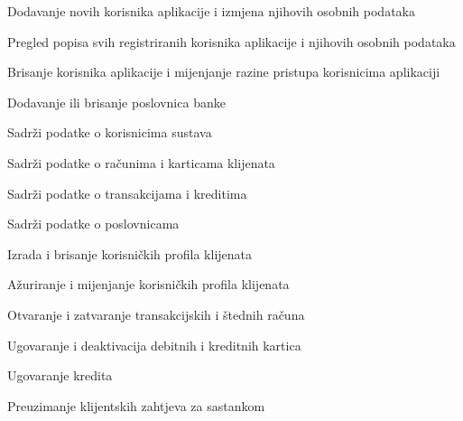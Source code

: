 			
			\begin{packed_enum}
				\item  {}
				
				\begin{packed_enum}
					
					\item Dodavanje novih korisnika aplikacije i izmjena njihovih osobnih podataka
					\item Pregled popisa svih registriranih korisnika aplikacije i njihovih osobnih podataka
					\item Brisanje korisnika aplikacije i mijenjanje razine pristupa korisnicima aplikaciji
					\item Dodavanje ili brisanje poslovnica banke
					
				\end{packed_enum}
			
				\item  {}
				
				\begin{packed_enum}
					
					\item Sadrži podatke o korisnicima sustava
					\item Sadrži podatke o računima i karticama klijenata
					\item Sadrži podatke o transakcijama i kreditima
					\item Sadrži podatke o poslovnicama
					
				\end{packed_enum}
				
				\item	{}
				
				\begin{packed_enum}
					
					\item Izrada i brisanje korisničkih profila klijenata
					\item Ažuriranje i mijenjanje korisničkih profila klijenata
					\item Otvaranje i zatvaranje transakcijskih i štednih računa
					\item Ugovaranje i deaktivacija debitnih i kreditnih kartica
					\item Ugovaranje kredita
					\item Preuzimanje klijentskih zahtjeva za sastankom
					
				\end{packed_enum}
			

\end{packed_enum}
